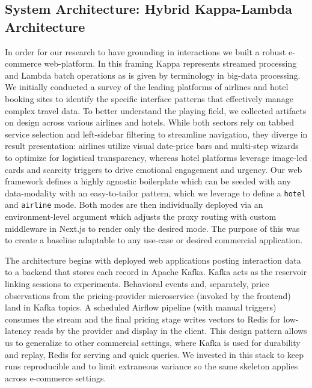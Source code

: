 \subsection{System Architecture: Hybrid Kappa-Lambda Architecture}

In order for our research to have grounding in interactions we built a robust e-commerce web-platform. In this framing Kappa represents streamed processing and Lambda batch operations as is given by terminology in big-data processing. We initially conducted a survey of the leading platforms of airlines and hotel booking sites to identify the specific interface patterns that effectively manage complex travel data. To better understand the playing field, we collected artifacts on design across various airlines and hotels. While both sectors rely on tabbed service selection and left-sidebar filtering to streamline navigation, they diverge in result presentation: airlines utilize visual date-price bars and multi-step wizards to optimize for logistical transparency, whereas hotel platforms leverage image-led cards and scarcity triggers to drive emotional engagement and urgency. Our web framework defines a highly agnostic boilerplate which can be seeded with any data-modality with an easy-to-tailor pattern, which we leverage to define a \texttt{hotel} and \texttt{airline} mode. Both modes are then individually deployed via an environment-level argument which adjusts the proxy routing with custom middleware in Next.js to render only the desired mode. The purpose of this was to create a baseline adaptable to any use-case or desired commercial application.

The architecture begins with deployed web applications posting interaction data to a backend that stores each record in Apache Kafka. Kafka acts as the reservoir linking sessions to experiments. Behavioral events and, separately, price observations from the pricing-provider microservice (invoked by the frontend) land in Kafka topics. A scheduled Airflow pipeline (with manual triggers) consumes the stream and the final pricing stage writes vectors to Redis for low-latency reads by the provider and display in the client. This design pattern allows us to generalize to other commercial settings, where Kafka is used for durability and replay, Redis for serving and quick queries. We invested in this stack to keep runs reproducible and to limit extraneous variance so the same skeleton applies across e-commerce settings.

